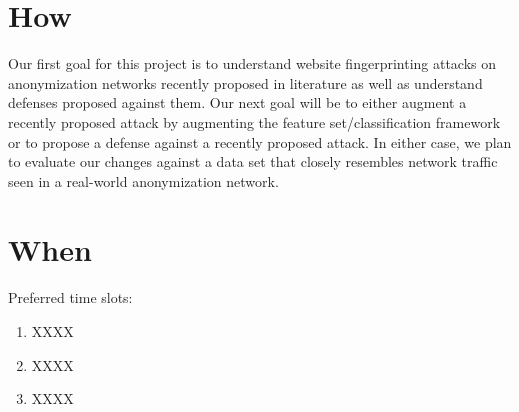 \documentclass{article}
\begin{document}
\section{How}
Our first goal for this project is to understand website fingerprinting
attacks on anonymization networks recently proposed in literature as
well as understand defenses proposed against them. Our next goal will be
to either augment a recently proposed attack by augmenting the feature
set/classification framework or to propose a defense against a recently
proposed attack. In either case, we plan to evaluate our changes against
a data set that closely resembles network traffic seen in a real-world
anonymization network. 

\section{When}
Preferred time slots:
\begin{enumerate}
\item XXXX
\item XXXX
\item XXXX

\end{enumerate}
\end{document}

